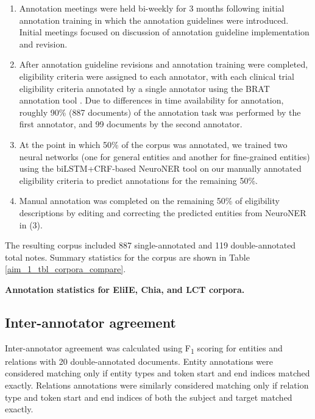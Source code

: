 \documentclass[../main.tex]{subfiles}
\begin{document}
\begin{enumerate}
    \item Annotation meetings were held bi-weekly for 3 months following initial annotation training in which the annotation guidelines were introduced. Initial meetings focused on discussion of annotation guideline implementation and revision.
    \item After annotation guideline revisions and annotation training were completed, eligibility criteria were assigned to each annotator, with each clinical trial eligibility criteria annotated by a single annotator using the BRAT annotation tool \cite{stenetorp2012brat}. Due to differences in time availability for annotation, roughly 90\% (887 documents) of the annotation task was performed by the first annotator, and 99 documents by the second annotator.
    \item At the point in which 50\% of the corpus was annotated, we trained two neural networks (one for general entities and another for fine-grained entities) using the biLSTM+CRF-based NeuroNER tool \cite{dernoncourt2017neuroner} on our manually annotated eligibility criteria to predict annotations for the remaining 50\%.
    \item Manual annotation was completed on the remaining 50\% of eligibility descriptions by editing and correcting the predicted entities from NeuroNER in (3).

\end{enumerate}    
    
The resulting corpus included 887 single-annotated and 119 double-annotated total notes. Summary statistics for the corpus are shown in Table \ref{aim_1_tbl_corpora_compare}.

\begin{table}[h!]
\centering
  
  \caption{\textbf{Annotation statistics for EliIE, Chia, and LCT corpora.}}
  \label{aim_1_tbl_corpora_compare}
\end{table}

\subsection{Inter-annotator agreement}
Inter-annotator agreement was calculated using F\textsubscript{1} scoring for entities and relations with 20 double-annotated documents. Entity annotations were considered matching only if entity types and token start and end indices matched exactly. Relations annotations were similarly considered matching only if relation type and token start and end indices of both the subject and target matched exactly.
\end{document}
